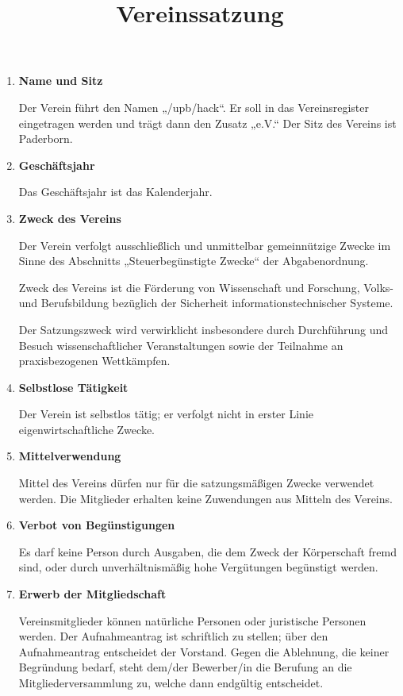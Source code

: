 \documentclass{article}
\title{\textsf{\textbf{Vereinssatzung}}}
\author{}
\date{}
\begin{document}
\maketitle

\begin{enumerate}[\textsection  1.]
\item \textsf{\textbf{Name und Sitz}}

	Der Verein führt den Namen „/upb/hack“. Er soll in das Vereinsregister eingetragen werden und trägt dann den Zusatz „e.V.“ Der Sitz des Vereins ist Paderborn.

\item \textsf{\textbf{Geschäftsjahr}}

	Das Geschäftsjahr ist das Kalenderjahr.

\item \textsf{\textbf{Zweck des Vereins}}

	Der Verein verfolgt ausschließlich und unmittelbar gemeinnützige Zwecke im Sinne des Abschnitts „Steuerbegünstigte Zwecke“ der Abgabenordnung.
	
	Zweck des Vereins ist die Förderung von Wissenschaft und Forschung, Volks- und Berufsbildung bezüglich der Sicherheit informationstechnischer Systeme.
	
	Der Satzungszweck wird verwirklicht insbesondere durch Durchführung und Besuch wissenschaftlicher
	Veranstaltungen sowie der Teilnahme an praxisbezogenen Wettkämpfen.

\item \textsf{\textbf{Selbstlose Tätigkeit}}

	Der Verein ist selbstlos tätig; er verfolgt nicht in erster Linie eigenwirtschaftliche Zwecke.

\item \textsf{\textbf{Mittelverwendung}}

	Mittel des Vereins dürfen nur für die satzungsmäßigen Zwecke verwendet werden. Die Mitglieder
	erhalten keine Zuwendungen aus Mitteln des Vereins.
	
\item \textsf{\textbf{Verbot von Begünstigungen}}

	Es darf keine Person durch Ausgaben, die dem Zweck der Körperschaft fremd sind, oder
	durch unverhältnismäßig hohe Vergütungen begünstigt werden.
	
\item \textsf{\textbf{Erwerb der Mitgliedschaft}}

	Vereinsmitglieder können natürliche Personen oder juristische Personen werden.
	Der Aufnahmeantrag ist schriftlich zu stellen;
	über den Aufnahmeantrag entscheidet der Vorstand.
	Gegen die Ablehnung, die keiner Begründung bedarf, steht dem/der Bewerber/in die
	Berufung an die Mitgliederversammlung zu, welche dann endgültig entscheidet.


\end{enumerate}
\end{document}
